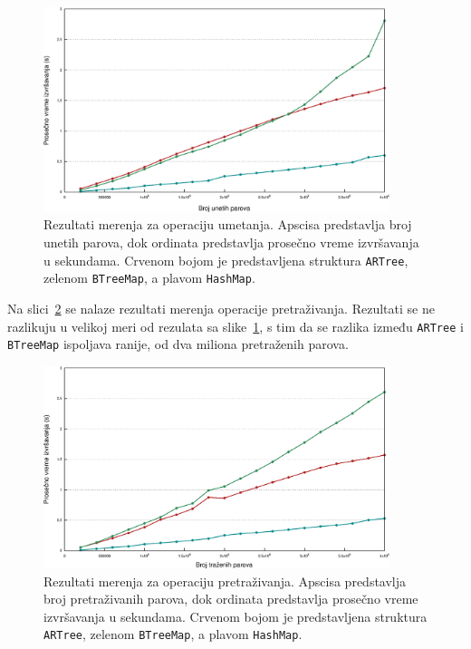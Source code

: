 \documentclass[12pt,oneside]{memoir}
\begin{document}
\begin{figure}[!h]
  \centering
  \includegraphics[width=0.90\textwidth]{lines_insert.eps}
  \caption{
    Rezultati merenja za operaciju umetanja. Apscisa predstavlja broj
    unetih parova, dok ordinata predstavlja prosečno vreme izvršavanja u sekundama.
    Crvenom bojom je predstavljena struktura
    \texttt{ARTree}, zelenom \texttt{BTreeMap}, a plavom \texttt{HashMap}.
  }
  \label{fig:bench_insert}
\end{figure}

Na slici~\ref{fig:bench_get} se nalaze rezultati merenja operacije
pretraživanja. Rezultati se ne razlikuju u velikoj meri od rezulata sa
slike~\ref{fig:bench_insert}, s tim da se razlika između \texttt{ARTree}
i \texttt{BTreeMap} ispoljava ranije, od dva miliona pretraženih
parova.

\begin{figure}[!h]
  \centering
  \includegraphics[width=0.90\textwidth]{lines_get.eps}
  \caption{
    Rezultati merenja za operaciju pretraživanja. Apscisa predstavlja broj
    pretraživanih parova, dok ordinata predstavlja prosečno vreme izvršavanja u sekundama.
    Crvenom bojom je predstavljena struktura
    \texttt{ARTree}, zelenom \texttt{BTreeMap}, a plavom \texttt{HashMap}.
  }
  \label{fig:bench_get}
\end{figure}
\end{document}
